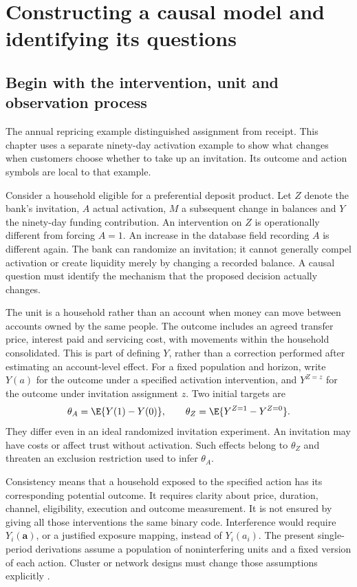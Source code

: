 \chapter{Constructing a causal model and identifying its questions}
\label{r3:graphs}
\section{Begin with the intervention, unit and observation process}
The annual repricing example distinguished assignment from receipt. This
chapter uses a separate ninety-day activation example to show what changes
when customers choose whether to take up an invitation. Its outcome and
action symbols are local to that example.

Consider a household eligible for a preferential deposit product. Let $Z$
denote the bank's invitation, $A$ actual activation, $M$ a subsequent change
in balances and $Y$ the ninety-day funding contribution. An intervention on
$Z$ is operationally different from forcing $A=1$. An increase in the
database field recording $A$ is different again. The bank can randomize an
invitation; it cannot generally compel activation or create liquidity merely
by changing a recorded balance. A causal question must identify the mechanism
that the proposed decision actually changes.

The unit is a household rather than an account when money can move between
accounts owned by the same people. The outcome includes an agreed transfer
price, interest paid and servicing cost, with movements within the household
consolidated. This is part of defining $Y$, rather than a correction performed
after estimating an account-level effect. For a fixed population and horizon,
write $Y(a)$ for the outcome under a specified activation intervention, and
$Y^{Z=z}$ for the outcome under invitation assignment $z$. Two initial targets
are
\begin{equation}
 \theta_A=\E\{Y(1)-Y(0)\},\qquad
 \theta_Z=\E\{Y^{Z=1}-Y^{Z=0}\}.
 \label{r3:targets}
\end{equation}
They differ even in an ideal randomized invitation experiment. An invitation
may have costs or affect trust without activation. Such effects belong to
$\theta_Z$ and threaten an exclusion restriction used to infer $\theta_A$.

Consistency means that a household exposed to the specified action has its
corresponding potential outcome. It requires clarity about price, duration,
channel, eligibility, execution and outcome measurement. It is not ensured
by giving all those interventions the same binary code. Interference would
require $Y_i(\mathbf a)$, or a justified exposure mapping, instead of $Y_i(a_i)$.
The present single-period derivations assume a population of noninterfering
units and a fixed version of each action. Cluster or network designs must
change those assumptions explicitly \citep[Chapters 1--3]{hernan2020}.

